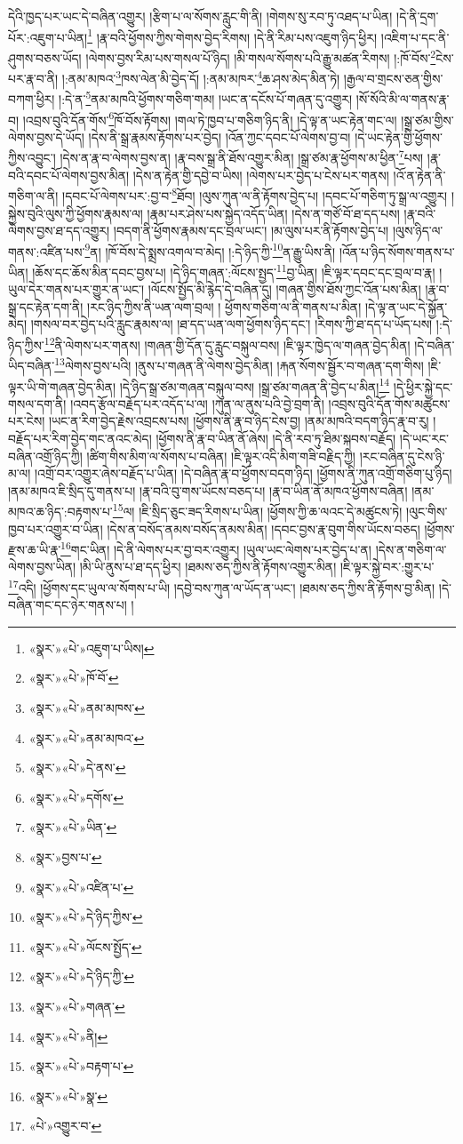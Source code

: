 དེའི་ཁྱད་པར་ཡང་དེ་བཞིན་འགྱུར། །རྩིག་པ་ལ་སོགས་རླུང་གི་ནི། །གེགས་སུ་རབ་ཏུ་འཐད་པ་ཡིན། །དེ་ནི་དྲག་པོར་:འཇུག་པ་ཡིན།\footnote{«སྣར་»«པེ་»འཇུག་པ་ཡིས།} །རྣ་བའི་ཕྱོགས་ཀྱིས་གེགས་བྱེད་རིགས། །དེ་ནི་རིམ་པས་འཇུག་ཉིད་ཕྱིར། །འཇིག་པ་དང་ནི་ཤུགས་བཅས་ཡོད། །ལེགས་བྱས་རིམ་པས་གསལ་པོ་ཉིད། །མི་གསལ་སོགས་པའི་རྒྱུ་མཚན་རིགས། །:ཁོ་བོས་\footnote{«སྣར་»«པེ་»ཁོ་བོ་}ངེས་པར་རྣ་བ་ནི། །:ནམ་མཁའ་\footnote{«སྣར་»«པེ་»ནམ་མཁས་}ཁས་ལེན་མི་བྱེད་དོ། །:ནམ་མཁར་\footnote{«སྣར་»«པེ་»ནམ་མཁའ་}ཆ་ཤས་མེད་མིན་ཏེ། །རྒྱལ་བ་གྲངས་ཅན་གྱིས་བཀག་ཕྱིར། །:དེ་ན་\footnote{«སྣར་»«པེ་»དེ་ནས་}ནམ་མཁའི་ཕྱོགས་གཅིག་གམ། །ཡང་ན་དངོས་པོ་གཞན་དུ་འགྱུར། །སོ་སོའི་མི་ལ་གནས་རྣ་བ། །འབྲས་བུའི་དོན་གོས་\footnote{«སྣར་»«པེ་»དགོས་}ཁོ་བོས་རྟོགས། །གལ་ཏེ་ཁྱབ་པ་གཅིག་ཉིད་ནི། །དེ་ལྟ་ན་ཡང་རྟེན་གང་ལ། །སྒྲ་ཙམ་གྱིས་ལེགས་བྱས་དེ་ཡོད། །དེས་ནི་སྒྲ་རྣམས་རྟོགས་པར་བྱེད། །འོན་ཀྱང་དབང་པོ་ལེགས་བྱ་བ། །དེ་ཡང་རྟེན་གྱི་ཕྱོགས་ཀྱིས་འབྱུང་། །དེས་ན་རྣ་བ་ལེགས་བྱས་ན། །རྣ་བས་སྒྲ་ནི་ཐོས་འགྱུར་མིན། །སྒྲ་ཙམ་རྣ་ཕྱོགས་མ་ཕྱིན་\footnote{«སྣར་»«པེ་»ཡིན་}པས། །རྣ་བའི་དབང་པོ་ལེགས་བྱས་མིན། །དེས་ན་རྟེན་གྱི་དབྱེ་བ་ཡིས། །ལེགས་པར་བྱེད་པ་ངེས་པར་གནས། །འོ་ན་རྟེན་ནི་གཅིག་ལ་ནི། །དབང་པོ་ལེགས་པར་:བྱ་བ་\footnote{«སྣར་»བྱས་པ་}ཐོབ། །ལུས་ཀུན་ལ་ནི་རྟོགས་བྱེད་པ། །དབང་པོ་གཅིག་ཏུ་སྒྲ་ལ་འགྱུར། །སྐྱེས་བུའི་ལུས་ཀྱི་ཕྱོགས་རྣམས་ལ། །རྣམ་པར་ཤེས་པས་སྐྱེད་འདོད་ཡིན། །དེས་ན་གཙོ་བོ་ཐ་དད་པས། །རྣ་བའི་ལེགས་བྱས་ཐ་དད་འགྱུར། །བདག་ནི་ཕྱོགས་རྣམས་དང་བྲལ་ཡང་། །མ་ལུས་པར་ནི་རྟོགས་བྱེད་པ། །ལུས་ཉིད་ལ་གནས་:འཛིན་པས་\footnote{«སྣར་»«པེ་»འཛིན་པ་}ན། །ཁོ་བོས་དེ་སྨྲས་འགལ་བ་མེད། །:དེ་ཉིད་ཀྱི་\footnote{«སྣར་»«པེ་»དེ་ཉིད་ཀྱིས་}ན་རྒྱུ་ཡིས་ནི། །འོན་པ་ཉིད་སོགས་གནས་པ་ཡིན། །ཆོས་དང་ཆོས་མིན་དབང་བྱས་པ། །དེ་ཉིད་གཞན་:ལོངས་སྤྱད་\footnote{«སྣར་»«པེ་»ལོངས་སྤྱོད་}བྱ་ཡིན། །ཇི་ལྟར་དབང་དང་བྲལ་བ་རྣ། །ཡུལ་དེར་གནས་པར་གྱུར་ན་ཡང་། །ལོངས་སྤྱོད་མི་རྙེད་དེ་བཞིན་དུ། །གཞན་གྱིས་ཐོས་ཀྱང་འོན་པས་མིན། །རྣ་བ་སྒྲ་དང་རྟེན་དག་ནི། །རང་ཉིད་ཀྱིས་ནི་ཡན་ལག་བྲལ། །
ཕྱོགས་གཅིག་ལ་ནི་གནས་པ་མིན། །དེ་ལྟ་ན་ཡང་དེ་སྐྱོན་མེད། །གསལ་བར་བྱེད་པའི་རླུང་རྣམས་ལ། །ཐ་དད་ཡན་ལག་ཕྱོགས་ཉིད་དང་། །རིགས་ཀྱི་ཐ་དད་པ་ཡོད་པས། །:དེ་ཉིད་ཀྱིས་\footnote{«སྣར་»«པེ་»དེ་ཉིད་ཀྱི་}ནི་ལེགས་པར་གནས། །གཞན་གྱི་དོན་དུ་རླུང་བསྐུལ་བས། །ཇི་ལྟར་ཁྱེད་ལ་གཞན་བྱེད་མིན། །དེ་བཞིན་ཡིད་བཞིན་\footnote{«སྣར་»«པེ་»གཞན་}ལེགས་བྱས་པའི། །ནུས་པ་གཞན་ནི་ལེགས་བྱེད་མིན། །རྐན་སོགས་སྦྱོར་བ་གཞན་དག་གིས། །ཇི་ལྟར་ཡི་གེ་གཞན་བྱེད་མིན། །དེ་ཉིད་སྒྲ་ཙམ་གཞན་བསྐུལ་བས། །སྒྲ་ཙམ་གཞན་ནི་བྱེད་པ་མིན།\footnote{«སྣར་»«པེ་»ནི།} །དེ་ཕྱིར་སྐྱེ་དང་གསལ་དག་ནི། །འབད་རྩོལ་བརྗོད་པར་འདོད་པ་ལ། །ཀུན་ལ་ནུས་པའི་བྱེ་བྲག་ནི། །འབྲས་བུའི་དོན་གོས་མཚུངས་པར་ངེས། །ཡང་ན་རིག་བྱེད་རྗེས་འབྲངས་པས། །ཕྱོགས་ནི་རྣ་བ་ཉིད་ངེས་བྱ། །ནམ་མཁའི་བདག་ཉིད་རྣ་བ་རུ། །བརྗོད་པར་རིག་བྱེད་གང་ནའང་མེད། །ཕྱོགས་ནི་རྣ་བ་ཡིན་ནོ་ཞེས། །དེ་ནི་རབ་ཏུ་ཐིམ་སྐབས་བརྗོད། །དེ་ཡང་རང་བཞིན་འགྲོ་ཉིད་ཀྱི། །ཚིག་གིས་མིག་ལ་སོགས་པ་བཞིན། །ཇི་ལྟར་འདི་མིག་གཟི་བརྗིད་ཀྱི། །རང་བཞིན་དུ་ངེས་ཉི་མ་ལ། །འགྲོ་བར་འགྱུར་ཞེས་བརྗོད་པ་ཡིན། །དེ་བཞིན་རྣ་བ་ཕྱོགས་བདག་ཉིད། །ཕྱོགས་ནི་ཀུན་འགྲོ་གཅིག་པུ་ཉིད། །ནམ་མཁའ་ཇི་སྲིད་དུ་གནས་པ། །རྣ་བའི་བུ་གས་ཡོངས་བཅད་པ། །རྣ་བ་ཡིན་ནོ་མཁའ་ཕྱོགས་བཞིན། །ནམ་མཁའ་ཆ་ཉིད་:བརྟགས་པ་\footnote{«སྣར་»«པེ་»བརྟག་པ་}ལ། །ཇི་སྲིད་ཅུང་ཟད་རིགས་པ་ཡིན། །ཕྱོགས་ཀྱི་ཆ་ལའང་དེ་མཚུངས་ཏེ། །ལུང་གིས་ཁྱབ་པར་འགྱུར་བ་ཡིན། །དེས་ན་བསོད་ནམས་བསོད་ནམས་མིན། །དབང་བྱས་རྣ་བུག་གིས་ཡོངས་བཅད། །ཕྱོགས་རྫས་ཆ་ཡི་རྣ་\footnote{«སྣར་»«པེ་»སྣ་}གང་ཡིན། །དེ་ནི་ལེགས་པར་བྱ་བར་འགྱུར། །ཡུལ་ཡང་ལེགས་པར་བྱེད་པ་ན། །དེས་ན་གཅིག་ལ་ལེགས་བྱས་ཡིན། །མི་ཡི་ནུས་པ་ཐ་དད་ཕྱིར། །ཐམས་ཅད་ཀྱིས་ནི་རྟོགས་འགྱུར་མིན། །ཇི་ལྟར་སྐྱེ་བར་:གྱུར་པ་\footnote{«པེ་»འགྱུར་བ་}འདི། །ཕྱོགས་དང་ཡུལ་ལ་སོགས་པ་ཡི། །དབྱེ་བས་ཀུན་ལ་ཡོད་ན་ཡང་། །ཐམས་ཅད་ཀྱིས་ནི་རྟོགས་བྱ་མིན། །དེ་བཞིན་གང་དང་ཉེར་གནས་པ། །
